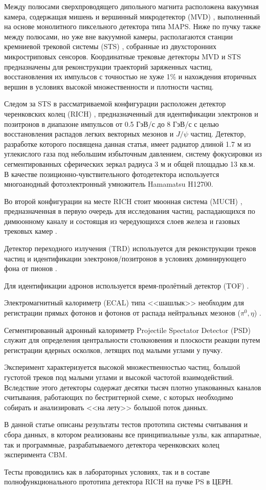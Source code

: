 Между полюсами сверхпроводящего дипольного магнита \cite{TDR_Magnet} расположена вакуумная камера, содержащая мишень и вершинный микродетектор (MVD) \cite{MVD_KOZIEL}, выполненный на основе монолитного пиксельного детектора типа MAPS. Ниже по пучку также между полюсами, но уже вне вакуумной камеры, располагаются станции кремниевой трековой системы (STS) \cite{TDR_STS}, собранные из двухсторонних микростриповых сенсоров. Координатные трековые детекторы MVD и STS предназначены для реконструкции траекторий заряженных частиц, восстановления их импульсов с точностью не хуже 1\% и нахождения вторичных вершин в условиях высокой множественности и плотности частиц.

Следом за STS в рассматриваемой конфигурации расположен детектор черенковских колец (RICH) \cite{TDR_RICH}, предназначенный для идентификации электронов и позитронов в диапазоне импульсов от 0.5 ГэВ/с до 8 ГэВ/с с целью восстановления распадов легких векторных мезонов и $ J / \psi $ частиц. Детектор, разработке которого посвящена данная статья, имеет радиатор длиной 1.7 м из углекислого газа под небольшим избыточным давлением, систему фокусировки из сегментированных сферических зеркал радиуса 3 м и общей площадью 13 кв.м. В качестве позиционно-чувствительного фотодетектора используется многоанодный фотоэлектронный умножитель Hamamatsu H12700.

Во второй конфигурации на месте RICH стоит мюонная система (MUCH) \cite{TDR_MUCH}, предназначенная в первую очередь для исследования частиц, распадающихся по димюонному каналу и состоящая из чередующихся слоев железа и газовых трековых камер \cite{}.

Детектор переходного излучения (TRD) используется для реконструкции треков частиц и идентификации электронов/позитронов в условиях доминирующего фона от пионов \cite{}.

Для идентификации адронов используется время-пролётный детектор (TOF) \cite{TDR_TOF}.

Электромагнитный калориметр (ECAL) типа <<шашлык>> необходим для регистрации прямых фотонов и фотонов от распада нейтральных мезонов ($ \pi^{0}, \eta $) \cite{ECAL_KOROLKO}.

Сегментированный адронный калориметр Projectile Spectator Detector (PSD) \cite{TDR_PSD} служит для определения центральности столкновения и плоскости реакции путем регистрации ядерных осколков, летящих под малыми углами у пучку.

Эксперимент характеризуется высокой множественностью частиц, большой густотой треков под малыми углами и высокой частотой взаимодействий. Вследствие этого детекторы содержат десятки тысяч плотно упакованных каналов считывания, работающих по бестриггерной схеме, с которых необходимо собирать и анализировать <<на лету>> большой поток данных.

В данной статье описаны результаты тестов прототипа системы считывания и сбора данных, в котором реализованы все принципиальные узлы, как аппаратные, так и программные, разрабатываемого детектора черенковских колец эксперимента CBM.

Тесты проводились как в лабораторных условиях, так и в составе полнофункционального прототипа детектора RICH на пучке PS в ЦЕРН.
